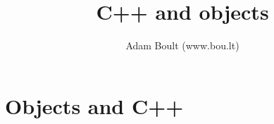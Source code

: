 \documentclass[oneside]{book}
\begin{document}
\author{Adam Boult (www.bou.lt)}
\title{C++ and objects}
\maketitle

\setcounter{tocdepth}{0}
\tableofcontents




\part{Objects and C++}



\end{document}

